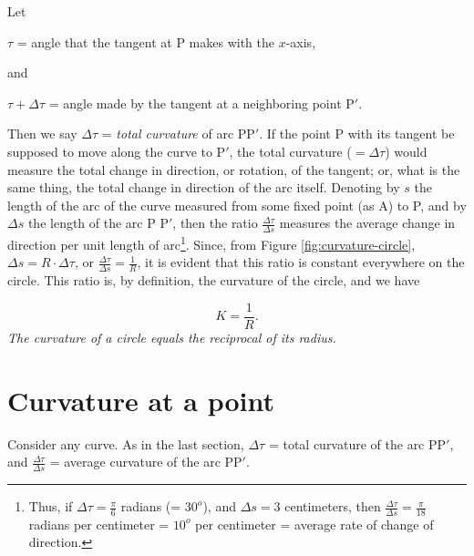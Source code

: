 Let 

\begin{center}
$\tau$ = angle that the tangent at P makes with the $x$-axis, 
\end{center}
and 

\begin{center}
$\tau + \Delta \tau$
= angle made by the tangent at a neighboring point P$'$.
\end{center}
Then we say $\Delta \tau$ = {\it total curvature} of arc PP$'$.
If the point P with its tangent be supposed to move along 
the curve to P$'$, the total curvature ($= \Delta \tau$) 
would measure the total change in direction, or rotation, 
of the tangent; or, what is the same thing, the total 
change in direction of the arc itself. Denoting by $s$ 
the length of the arc of the curve measured from some 
fixed point (as A) to P, and by $\Delta s$ the length of 
the arc P P$'$, then the ratio
$\frac{\Delta \tau}{\Delta s}$
measures the average change in direction per unit 
length of arc\footnote{Thus, if 
$\Delta \tau = \frac{\pi}{6}$ radians (= $30^o$), and 
$\Delta s = 3$ centimeters, then 
$\frac{\Delta \tau}{\Delta s} = \frac{\pi}{18}$ radians 
per centimeter = $10^o$ per centimeter 
= average rate of change of direction.}. 
Since, from Figure \ref{fig:curvature-circle},
$  	\Delta s = R \cdot \Delta \tau$,
or $	\frac{\Delta \tau}{\Delta s} = \frac{1}{R}$,
it is evident that this ratio is constant everywhere 
on the circle. This ratio is, by definition, the 
curvature of the circle, and we have

\begin{equation}
K = \frac{1}{R}.
\label{eqn:100-38}
\end{equation}
{\it The curvature of a circle equals the reciprocal of its radius.}

\section{Curvature at a point}

Consider any curve. As in the last section,
$\Delta \tau$ = total curvature of the arc PP$'$,
and 
$\frac{\Delta \tau}{\Delta s}$ = 
average curvature of the arc PP$'$.

